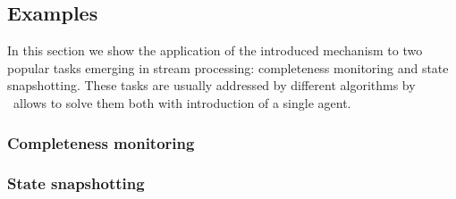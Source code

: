 \subsection{Examples}
In this section we show the application of the introduced mechanism to two popular tasks emerging in stream processing: completeness monitoring and state snapshotting. These tasks are usually addressed by different algorithms by \tracker\ allows to solve them both with introduction of a single agent.
\subsubsection{Completeness monitoring}

\subsubsection{State snapshotting}




